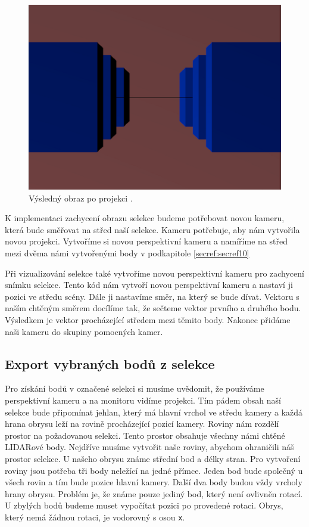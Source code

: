\documentclass[czech,bachelor,dept420,male,cpdeclaration]{diploma}
\begin{document}
\begin{figure}[H]
\centering
\includegraphics[width=0.6\linewidth]{Figures/finalProjectionImageFromCamera.png}
\caption{Výsledný obraz po projekci \cite{tutorial3matrices}. }
\label{fig:finalProjectionImageFromCamera}
\end{figure} 

K implementaci zachycení obrazu selekce budeme potřebovat novou kameru, která bude směřovat na střed naší selekce. Kameru potřebuje, aby nám vytvořila novou projekci. Vytvoříme si novou perspektivní kameru a namíříme na střed mezi dvěma námi vytvořenými body v podkapitole \ref{secref:secref10} 


 
Při vizualizování selekce také vytvoříme novou perspektivní kameru pro zachycení snímku selekce. Tento kód nám vytvoří novou perspektivní kameru a nastaví ji pozici ve středu scény. Dále ji nastavíme směr, na který se bude dívat. Vektoru s naším chtěným směrem docílíme tak, že sečteme vektor prvního a druhého bodu. Výsledkem je vektor procházející středem mezi těmito body. Nakonec přidáme naši kameru do skupiny pomocných kamer. 




\subsection{Export vybraných bodů z selekce}
Pro získání bodů v označené selekci si musíme uvědomit, že používáme perspektivní kameru a na monitoru vidíme projekci. Tím pádem obsah naší selekce bude připomínat jehlan, který má hlavní vrchol ve středu kamery a každá hrana obrysu leží na rovině procházející pozicí kamery. Roviny nám rozdělí prostor na požadovanou selekci. Tento prostor obsahuje všechny námi chtěné LIDARové body. Nejdříve musíme vytvořit naše roviny, abychom ohraničili náš prostor selekce. U našeho obrysu známe střední bod a délky stran. Pro vytvoření roviny jsou potřeba tři body neležící na jedné přímce. Jeden bod bude společný u všech rovin a tím bude pozice hlavní kamery. Další dva body budou vždy vrcholy hrany obrysu. Problém je, že známe pouze jediný bod, který není ovlivněn rotací. U zbylých bodů budeme muset vypočítat pozici po provedené rotaci. Obrys, který nemá žádnou rotaci, je vodorovný s osou \texttt{x}. 
\end{document}
